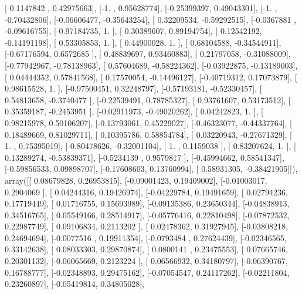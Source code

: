 \documentclass{article}
\begin{document}
       [ 0.1147842 ,  0.42975663],
       [-1.        ,  0.95628774],
       [-0.25399397,  0.49043301],
       [-1.        , -0.70432806],
       [-0.06606477, -0.35643254],
       [ 0.32209534, -0.59292515],
       [-0.0367881 , -0.09616755],
       [-0.97184735,  1.        ],
       [ 0.30389607,  0.89194754],
       [ 0.12542192, -0.14191198],
       [ 0.53305853,  1.        ],
       [ 0.44900028,  1.        ],
       [ 0.68104588, -0.34544911],
       [-0.67176594,  0.6572685 ],
       [ 0.48839697,  0.93460883],
       [ 0.21797058, -0.31088009],
       [-0.77942967, -0.78138963],
       [ 0.57604689, -0.58224362],
       [-0.03922875, -0.13189003],
       [ 0.04444352,  0.57841568],
       [ 0.17570054, -0.14496127],
       [-0.40719312,  0.17073879],
       [ 0.98615528,  1.        ],
       [-0.97500451,  0.32248797],
       [-0.57193181, -0.52330457],
       [ 0.54813658, -0.3740477 ],
       [-0.22539491,  0.78785327],
       [ 0.93761607,  0.53173512],
       [ 0.35359187, -0.2453951 ],
       [-0.02911973, -0.49020262],
       [ 0.04242823,  1.        ],
       [ 0.98215978,  0.50106207],
       [-0.13793061,  0.45229027],
       [-0.46323077, -0.44337764],
       [ 0.18489669,  0.81029711],
       [ 0.10395786,  0.58854784],
       [ 0.03220943, -0.27671329],
       [ 1.        ,  0.75395019],
       [-0.80478626, -0.32001104],
       [ 1.        ,  0.1159038 ],
       [ 0.83207624,  1.        ],
       [ 0.13289274, -0.53839371],
       [-0.5234139 ,  0.9579817 ],
       [-0.45994662,  0.58541347],
       [-0.59856533,  0.09898707],
       [-0.17608603,  0.13760994],
       [ 0.58931305, -0.38421905]]), array([[ 0.08679828,  0.26953815],
       [-0.09001423,  0.19409002],
       [-0.01003017,  0.2904069 ],
       [ 0.04244316,  0.19426974],
       [-0.04229784,  0.19491659],
       [ 0.02794236,  0.17719449],
       [ 0.01716755,  0.15693989],
       [-0.09135386,  0.23650344],
       [-0.04838913,  0.34516765],
       [ 0.05549166,  0.28514917],
       [-0.05776416,  0.22810498],
       [-0.07872532,  0.22987749],
       [ 0.09106834,  0.2113202 ],
       [ 0.02478362,  0.31927945],
       [-0.03808218,  0.24694694],
       [-0.0077516 ,  0.19911354],
       [-0.0793484 ,  0.27624439],
       [-0.02346565,  0.33142638],
       [ 0.08033303,  0.29870874],
       [ 0.0800141 ,  0.23475553],
       [ 0.07665746,  0.20301132],
       [-0.06065669,  0.2123224 ],
       [ 0.06566932,  0.34180797],
       [-0.06390767,  0.16788777],
       [-0.02348893,  0.29475162],
       [-0.07054547,  0.24117262],
       [-0.02211804,  0.23260897],
       [-0.05419814,  0.34805028],
\end{document}
